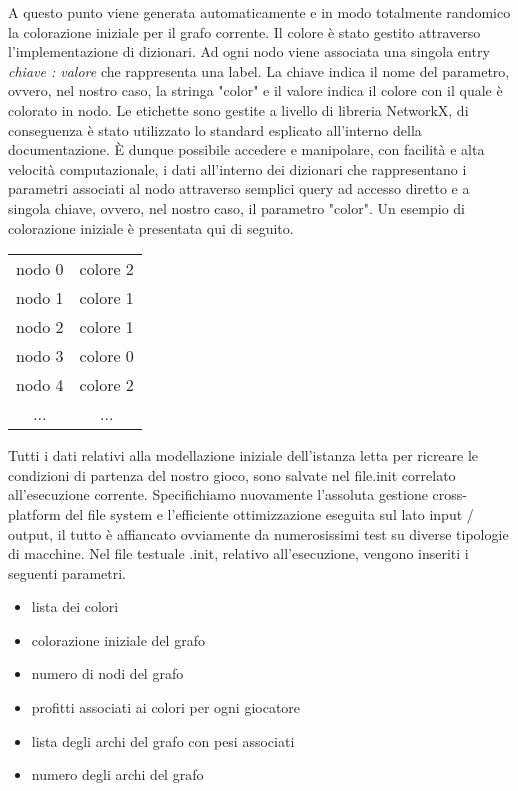 A questo punto viene generata automaticamente e in modo totalmente randomico la colorazione iniziale per il grafo corrente. Il colore è stato gestito attraverso l'implementazione di dizionari. Ad ogni nodo viene associata una singola entry \textit{chiave : valore} che rappresenta una label. La chiave indica il nome del parametro, ovvero, nel nostro caso, la stringa "color" e il valore indica il colore con il quale è colorato in nodo. Le etichette sono gestite a livello di libreria NetworkX, di conseguenza è stato utilizzato lo standard esplicato all'interno della documentazione. È dunque possibile accedere e manipolare, con facilità e alta velocità computazionale, i dati all'interno dei dizionari che rappresentano i parametri associati al nodo attraverso semplici query ad accesso diretto e a singola chiave, ovvero, nel nostro caso, il parametro "color". Un esempio di colorazione iniziale è presentata qui di seguito.

\begin{table}[H]
\centering
\begin{tabular}{cc}
nodo 0 & colore 2 \\
nodo 1 & colore 1 \\
nodo 2 & colore 1 \\
nodo 3 & colore 0 \\
nodo 4 & colore 2 \\
... & ...
\end{tabular}
\end{table}

Tutti i dati relativi alla modellazione iniziale dell'istanza letta per ricreare le condizioni di partenza del nostro gioco, sono salvate nel file.init correlato all'esecuzione corrente. Specifichiamo nuovamente l'assoluta gestione cross-platform del file system e l'efficiente ottimizzazione eseguita sul lato input / output, il tutto è affiancato ovviamente da numerosissimi test su diverse tipologie di macchine. Nel file testuale .init, relativo all'esecuzione, vengono inseriti i seguenti parametri.

\begin{itemize}
	\item lista dei colori
	\item colorazione iniziale del grafo
	\item numero di nodi del grafo
	\item profitti associati ai colori per ogni giocatore
	\item lista degli archi del grafo con pesi associati
	\item numero degli archi del grafo
\end{itemize}

